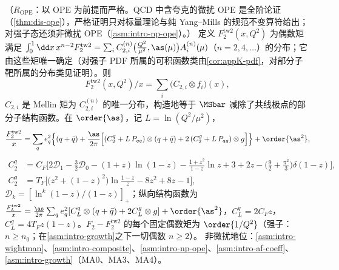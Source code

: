 \begin{theorem}\label{thm:pdf-dis-xspace}
（$R_{\mathrm{OPE}}$：以 OPE 为前提而严格。QCD 中含夸克的微扰 OPE 是全阶论证（\cref{thm:dis-ope}），严格证明只对标量理论与纯 Yang--Mills 的规范不变算符给出；对强子态还须非微扰 OPE（\cref{asm:intro-np-ope}）。）
定义 $F_2^{\mathrm{tw2}}(x,Q^2)$ 为偶数矩满足 $\int_0^1\dd x\,x^{n-2}F_2^{\mathrm{tw2}}=\sum_iC^{(n)}_{2,i}\big(\frac{Q^2}{\mu^2},\as(\mu)\big)A^{(n)}_i(\mu)$（$n=2,4,\dots$）的分布；它由这些矩唯一确定（对强子 PDF 所属的可积函数类由\cref{cor:appK-pdf}，对部分子靶所属的分布类见证明）。则
\begin{equation}\label{eq:pdf-xspace}
F_2^{\mathrm{tw2}}(x,Q^2)/x=\textstyle\sum_i\big(C_{2,i}\otimes f_i\big)(x),
\end{equation}
$C_{2,i}$ 是 Mellin 矩为 $C^{(n)}_{2,i}$ 的唯一分布，构造地等于 $\MSbar$ 减除了共线极点的部分子结构函数。在 $\order{\as}$，记 $L=\ln(Q^2/\mu^2)$，
\begin{equation}\label{eq:pdf-F2nlo}
\frac{F_2^{\mathrm{tw2}}}{x}=\sum_qe_q^2\Big\{(q+\bar q)+\frac{\as}{2\pi}\Big[(C_2^q+L\,P_{qq})\otimes(q+\bar q)+2\,(C_2^g+L\,P_{qg})\otimes g\Big]\Big\}+\order{\as^2},
\end{equation}
\begin{equation}\label{eq:pdf-C2}
\begin{aligned}
C_2^q&=C_F\Big[2\mathcal D_1-\tfrac32\mathcal D_0-(1+z)\ln(1-z)-\tfrac{1+z^2}{1-z}\ln z+3+2z-\big(\tfrac92+\tfrac{\pi^2}3\big)\delta(1-z)\Big],\\
C_2^g&=T_F\Big[\big(z^2+(1-z)^2\big)\ln\tfrac{1-z}{z}-8z^2+8z-1\Big],
\end{aligned}
\end{equation}
$\mathcal D_k=[\ln^k(1-z)/(1-z)]_+$；纵向结构函数为 $\frac{F_L^{\mathrm{tw2}}}{x}=\frac{\as}{2\pi}\sum_qe_q^2[C_L^q\otimes(q+\bar q)+2C_L^g\otimes g]+\order{\as^2}$，$C_L^q=2C_Fz$，$C_L^g=4T_Fz(1-z)$。$F_2-F_2^{\mathrm{tw2}}$ 的每个固定偶数矩为 $\order{1/Q^2}$（强子：$n\ge n_0$；在\cref{asm:intro-growth}之下一切偶数 $n\ge2$）。
非微扰地位：\cref{asm:intro-wightman}、\cref{asm:intro-composite}、\cref{asm:intro-np-ope}、\cref{asm:intro-af-coeff}、\cref{asm:intro-growth}（MA0、MA3、MA4）。
\end{theorem}

